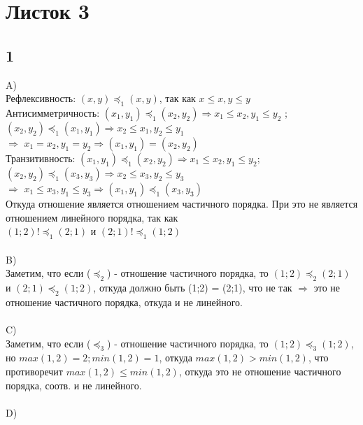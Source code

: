 \newpage	
	\section{Листок 3}
	
		\subsection{1}
		A)\\
		Рефлексивность: $(x, y) \preccurlyeq_1 (x, y)$, так как $x \leqslant x, y \leqslant y$\\
		Антисимметричность: $(x_1, y_1) \preccurlyeq_1 (x_2, y_2)  \Longrightarrow  x_1 \leqslant x_2, y_1 \leqslant y_2$ ;\\ 
		$(x_2, y_2) \preccurlyeq_1 (x_1, y_1)  \Longrightarrow  x_2 \leqslant x_1, y_2 \leqslant y_1$ \\
		$\Longrightarrow$ $x_1 = x_2, y_1 = y_2 \Longrightarrow (x_1, y_1) = (x_2, y_2)$\\
		Транзитивность: $(x_1, y_1) \preccurlyeq_1 (x_2, y_2)  \Longrightarrow  x_1 \leqslant x_2, y_1 \leqslant y_2$; \\
		$(x_2, y_2) \preccurlyeq_1 (x_3, y_3)  \Longrightarrow  x_2 \leqslant x_3, y_2 \leqslant y_3$ \\
		$\Longrightarrow$ $x_1 \leqslant x_3, y_1 \leqslant y_3 \Longrightarrow (x_1, y_1) \preccurlyeq_1 (x_3, y_3)$
		\\
		Откуда отношение является отношением частичного порядка. При это не является отношением линейного порядка, так как\\
		$(1;2) !\preccurlyeq_1 (2;1)$ и $(2;1) !\preccurlyeq_1 (1;2)$
		\\ \\
		B)\\
		Заметим, что если ($\preccurlyeq_2$) - отношение частичного порядка, то
		$(1;2) \preccurlyeq_2 (2;1)$ и $(2;1) \preccurlyeq_2 (1;2)$, откуда должно быть (1;2) = (2;1), что не так $\Longrightarrow$ это не отношение частичного порядка, откуда и не линейного.
		\\ \\
		C)\\
		Заметим, что если ($\preccurlyeq_3$) - отношение частичного порядка, то
		$(1;2) \preccurlyeq_3 (1;2)$, но $max(1, 2) = 2; min(1, 2) = 1$, откуда $max(1, 2) > min(1, 2)$, что противоречит $max(1, 2) \leqslant min(1, 2)$, откуда это не отношение частичного порядка, соотв. и не линейного.
		\\ \\
		D)\\
